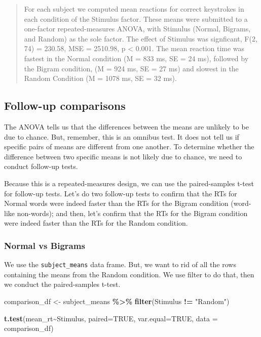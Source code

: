 \documentclass[
]{book}
\newenvironment{Shaded}{\begin{snugshade}}{\end{snugshade}}
\newcommand{\AttributeTok}[1]{\textcolor[rgb]{0.13,0.29,0.53}{#1}}
\newcommand{\ConstantTok}[1]{\textcolor[rgb]{0.56,0.35,0.01}{#1}}
\newcommand{\FunctionTok}[1]{\textcolor[rgb]{0.13,0.29,0.53}{\textbf{#1}}}
\newcommand{\NormalTok}[1]{#1}
\newcommand{\OtherTok}[1]{\textcolor[rgb]{0.56,0.35,0.01}{#1}}
\newcommand{\SpecialCharTok}[1]{\textcolor[rgb]{0.81,0.36,0.00}{\textbf{#1}}}
\newcommand{\StringTok}[1]{\textcolor[rgb]{0.31,0.60,0.02}{#1}}
\begin{document}
\begin{quote}
For each subject we computed mean reactions for correct keystrokes in each condition of the Stimulus factor. These means were submitted to a one-factor repeated-measures ANOVA, with Stimulus (Normal, Bigrams, and Random) as the sole factor. The effect of Stimulus was signficant, F(2, 74) = 230.58, MSE = 2510.98, p \textless{} 0.001. The mean reaction time was fastest in the Normal condition (M = 833 ms, SE = 24 ms), followed by the Bigram condition, (M = 924 ms, SE = 27 ms) and slowest in the Random Condition (M = 1078 ms, SE = 32 ms).
\end{quote}

\hypertarget{follow-up-comparisons}{%
\subsection{Follow-up comparisons}\label{follow-up-comparisons}}

The ANOVA tells us that the differences between the means are unlikely to be due to chance. But, remember, this is an omnibus test. It does not tell us if specific pairs of means are different from one another. To determine whether the difference between two specific means is not likely due to chance, we need to conduct follow-up tests.

Because this is a repeated-measures design, we can use the paired-samples t-test for follow-up tests. Let's do two follow-up tests to confirm that the RTs for Normal words were indeed faster than the RTs for the Bigram condition (word-like non-words); and then, let's confirm that the RTs for the Bigram condition were indeed faster than the RTs for the Random condition.

\hypertarget{normal-vs-bigrams}{%
\subsubsection{Normal vs Bigrams}\label{normal-vs-bigrams}}

We use the \texttt{subject\_means} data frame. But, we want to rid of all the rows containing the means from the Random condition. We use filter to do that, then we conduct the paired-samples t-test.

\begin{Shaded}
\begin{Highlighting}[]
\NormalTok{comparison\_df }\OtherTok{\textless{}{-}}\NormalTok{ subject\_means }\SpecialCharTok{\%\textgreater{}\%}
                  \FunctionTok{filter}\NormalTok{(Stimulus }\SpecialCharTok{!=} \StringTok{"Random"}\NormalTok{)}

\FunctionTok{t.test}\NormalTok{(mean\_rt}\SpecialCharTok{\textasciitilde{}}\NormalTok{Stimulus, }
       \AttributeTok{paired=}\ConstantTok{TRUE}\NormalTok{, }
       \AttributeTok{var.equal=}\ConstantTok{TRUE}\NormalTok{, }
       \AttributeTok{data =}\NormalTok{ comparison\_df)}
\end{Highlighting}
\end{Shaded}
\end{document}
